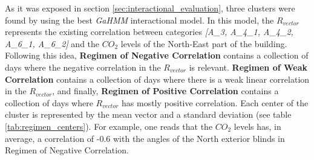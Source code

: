 As it was exposed in section \ref{sec:interactional_evaluation}, three clusters were found by using the best \textit{GaHMM} interactional model. In this model, the $R_{vector}$ represents the existing correlation between categories \textit{[A\_3, A\_{4\_1}, A\_{4\_2},  A\_{6\_1}, A\_{6\_2}]} and the $CO_2$ levels of the North-East part of the building. Following this idea, \textbf{Regimen of Negative Correlation} contains a collection of days where the negative correlation in the $R_{vector}$ is relevant. \textbf{Regimen of Weak Correlation} contains a collection of days where there is a weak linear correlation in the $R_{vector}$, and finally, \textbf{Regimen of Positive Correlation} contains a collection of days where \textbf{$R_{vector}$} has mostly positive correlation. Each center of the cluster is represented by the mean vector and a standard deviation (see table \ref{tab:regimen_centers}). For example, one reads that the $CO_2$ levels has, in average, a correlation of -0.6 with the angles of the North exterior blinds in Regimen of Negative Correlation.

